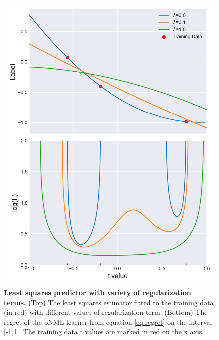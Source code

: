 \documentclass[conference,letterpaper]{IEEEtran}
\begin{document}
\begin{figure}[h] 
    \centering
    \includegraphics[width=\linewidth]{figures/least_sqaures_with_regularization.jpg}
    \caption{\textbf{Least squares predictor with variety of regularization terms.} (Top) The least squares estimator fitted to the training data (in red) with different values of regularization term. (Bottom) The regret of the pNML learner from equation \ref{eq:regret} on the interval [-1,1]. The training data t values are marked in red on the x axis.}
    \label{fig:least_squares_with_reg}
\end{figure}
\end{document}
